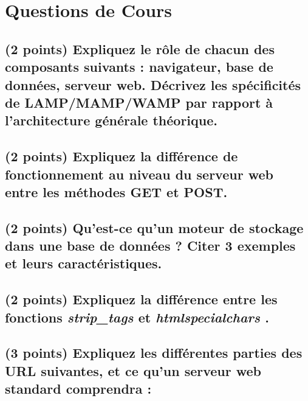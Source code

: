 \documentclass[11pt,a4paper]{article}
\begin{document}
\MakeExamTitle                   %


\section{Questions de Cours}

\subsection{(2 points) Expliquez le rôle de chacun des composants suivants : navigateur, base de données, serveur web. Décrivez les spécificités de LAMP/MAMP/WAMP par rapport à l'architecture générale théorique.}

\bigskip
\bigskip
\bigskip
\bigskip
\bigskip
\bigskip
\bigskip
\bigskip
\bigskip

\subsection{(2 points) Expliquez la différence de fonctionnement au niveau du serveur web entre les méthodes GET et POST.}

\bigskip
\bigskip
\bigskip
\bigskip
\bigskip
\bigskip
\bigskip
\bigskip
\bigskip

\subsection{(2 points) Qu'est-ce qu'un moteur de stockage dans une base de données ? Citer 3 exemples et leurs caractéristiques.}

\bigskip
\bigskip
\bigskip
\bigskip
\bigskip
\bigskip
\bigskip
\bigskip
\bigskip

\subsection{(2 points) Expliquez la différence entre les fonctions \textit{strip\_tags} et \textit{htmlspecialchars} .}

\bigskip
\bigskip
\bigskip
\bigskip
\bigskip
\bigskip
\bigskip
\bigskip
\bigskip

\newpage

\subsection{(3 points) Expliquez les différentes parties des URL suivantes, et ce qu'un serveur web standard comprendra :}
\end{document}
